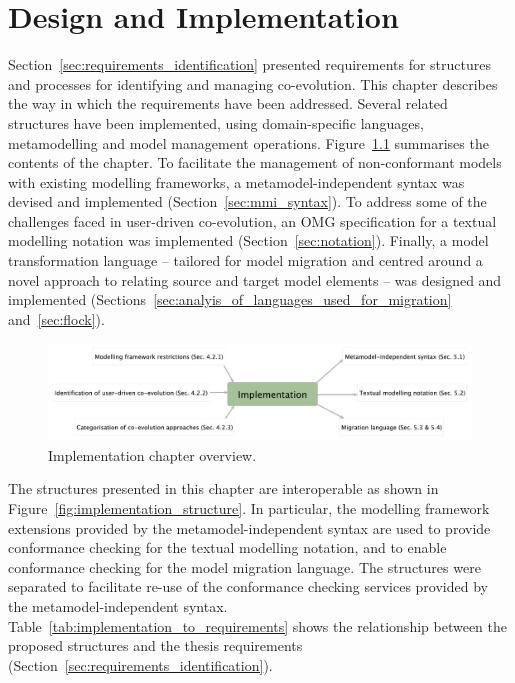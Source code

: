 
\chapter{Design and Implementation}
\label{Implementation}
Section~\ref{sec:requirements_identification} presented requirements for structures and processes for identifying and managing co-evolution. This chapter describes the way in which the requirements have been addressed. Several related structures have been implemented, using domain-specific languages, metamodelling and model management operations. Figure~\ref{fig:implementation_overview} summarises the contents of the chapter. To facilitate the management of non-conformant models with existing modelling frameworks, a metamodel-independent syntax was devised and implemented (Section~\ref{sec:mmi_syntax}). To address some of the challenges faced in user-driven co-evolution, an OMG specification for a textual modelling notation was implemented (Section~\ref{sec:notation}). Finally, a model transformation language -- tailored for model migration and centred around a novel approach to relating source and target model elements -- was designed and implemented (Sections~\ref{sec:analyis_of_languages_used_for_migration} and~\ref{sec:flock}). 

\begin{figure}[htbp]
  \begin{center}
    \leavevmode
    \includegraphics[width=12cm]{5.Implementation/overview.pdf}
  \end{center}
  \caption{Implementation chapter overview.}
  \label{fig:implementation_overview}
\end{figure}

The structures presented in this chapter are interoperable as shown in Figure~\ref{fig:implementation_structure}. In particular, the modelling framework extensions provided by the metamodel-independent syntax are used to provide conformance checking for the textual modelling notation, and to enable conformance checking for the model migration language. The structures were separated to facilitate re-use of the conformance checking services provided by the metamodel-independent syntax. Table~\ref{tab:implementation_to_requirements} shows the relationship between the proposed structures and the thesis requirements (Section~\ref{sec:requirements_identification}).

